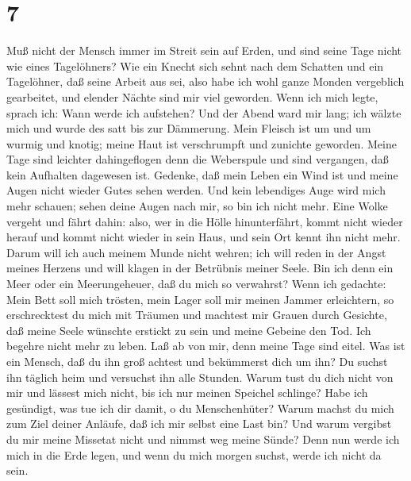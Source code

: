 \hypertarget{section-6}{%
\section{7}\label{section-6}}

 Muß nicht der Mensch immer im Streit sein auf Erden, und
sind seine Tage nicht wie eines Tagelöhners?  Wie ein Knecht
sich sehnt nach dem Schatten und ein Tagelöhner, daß seine Arbeit aus
sei,  also habe ich wohl ganze Monden vergeblich gearbeitet,
und elender Nächte sind mir viel geworden.  Wenn ich mich
legte, sprach ich: Wann werde ich aufstehen? Und der Abend ward mir
lang; ich wälzte mich und wurde des satt bis zur Dämmerung. 
Mein Fleisch ist um und um wurmig und knotig; meine Haut ist
verschrumpft und zunichte geworden.  Meine Tage sind
leichter dahingeflogen denn die Weberspule und sind vergangen, daß kein
Aufhalten dagewesen ist.  Gedenke, daß mein Leben ein Wind
ist und meine Augen nicht wieder Gutes sehen werden.  Und
kein lebendiges Auge wird mich mehr schauen; sehen deine Augen nach mir,
so bin ich nicht mehr.  Eine Wolke vergeht und fährt dahin:
also, wer in die Hölle hinunterfährt, kommt nicht wieder herauf
 und kommt nicht wieder in sein Haus, und sein Ort kennt
ihn nicht mehr.  Darum will ich auch meinem Munde nicht
wehren; ich will reden in der Angst meines Herzens und will klagen in
der Betrübnis meiner Seele.  Bin ich denn ein Meer oder ein
Meerungeheuer, daß du mich so verwahrst?  Wenn ich
gedachte: Mein Bett soll mich trösten, mein Lager soll mir meinen Jammer
erleichtern,  so erschrecktest du mich mit Träumen und
machtest mir Grauen durch Gesichte,  daß meine Seele
wünschte erstickt zu sein und meine Gebeine den Tod.  Ich
begehre nicht mehr zu leben. Laß ab von mir, denn meine Tage sind eitel.
 Was ist ein Mensch, daß du ihn groß achtest und bekümmerst
dich um ihn?  Du suchst ihn täglich heim und versuchst ihn
alle Stunden.  Warum tust du dich nicht von mir und lässest
mich nicht, bis ich nur meinen Speichel schlinge?  Habe ich
gesündigt, was tue ich dir damit, o du Menschenhüter? Warum machst du
mich zum Ziel deiner Anläufe, daß ich mir selbst eine Last bin?
 Und warum vergibst du mir meine Missetat nicht und nimmst
weg meine Sünde? Denn nun werde ich mich in die Erde legen, und wenn du
mich morgen suchst, werde ich nicht da sein.

